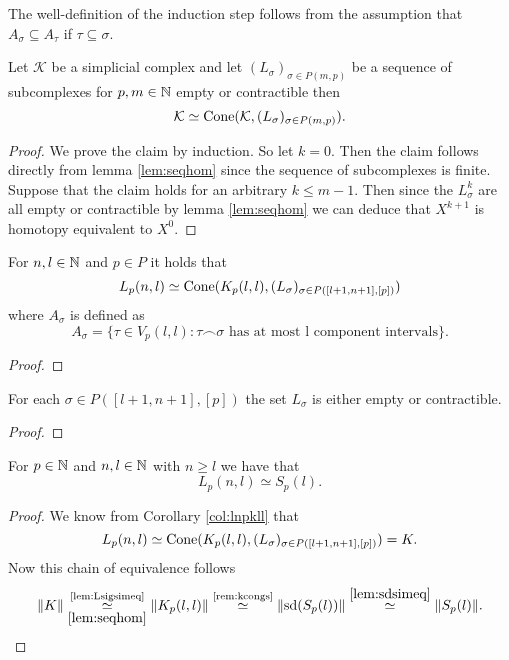 The well-definition of the induction step follows from the assumption that $A_\sigma \subseteq A_\tau$ if $\tau \subseteq \sigma$.

\begin{lemma}
  Let $\mathcal{K}$ be a simplicial complex and let $(L_\sigma)_{\sigma \in P(m,p)}$ be a sequence of subcomplexes for $p,m \in \mathbb{N}$ empty or contractible then \[\mathcal{K} \simeq {\rm Cone}(\mathcal{K}, (L_\sigma)_{\sigma \in P(m,p)}).\]  
\end{lemma}

\begin{proof}
  We prove the claim by induction. So let $k = 0$. Then the claim follows directly from lemma \ref{lem:seqhom} since the sequence of subcomplexes is finite.
  Suppose that the claim holds for an arbitrary $k \leq m - 1$. Then since the $L^k_\sigma$ are all empty or contractible by lemma \ref{lem:seqhom} we can deduce that $X^{k+1}$ is homotopy equivalent to $X^0$.
\end{proof}

\begin{col}\label{col:lnpkll}
  For $n,l \in \mathbb{N}$ and $p \in P$ it holds that \[L_p(n,l) \simeq {\rm Cone}(K_p(l,l), (L_\sigma)_{\sigma \in P([l+1,n+1],[p])})\]where $A_\sigma$ is defined as \[A_\sigma = \{\tau\in V_p(l,l)\colon \tau\frown\sigma \text{ has at most l component intervals}\}.\]
\end{col}

\begin{proof}
  
\end{proof}

\begin{lemma}\label{lem:Lsigsimeq}
  For each $\sigma \in P([l+1,n+1], [p])$ the set $L_\sigma$ is either empty or contractible.
\end{lemma}


\begin{proof}
  
\end{proof}

\begin{col}
  For $p \in \mathbb{N}$ and $n,l\in \mathbb{N}$ with $n \geq l$ we have that \[L_p(n,l) \simeq S_p(l).\]
\end{col}

\begin{proof}
  We know from Corollary \ref{col:lnpkll} that \[L_p(n,l) \simeq {\rm Cone}(K_p(l,l), (L_\sigma)_{\sigma\in P([l+1,n+1],[p])}) = K.\] Now this chain of equivalence follows
  \begin{equation*}
    \lVert K \rVert \underset{\ref{lem:seqhom}}{\overset{\text{\ref{lem:Lsigsimeq}}}{\simeq}} \lVert K_p(l,l) \rVert \overset{\text{\ref{rem:kcongs}}}{\simeq} \lVert {\rm sd}(S_p(l)) \rVert \overset{\ref{lem:sdsimeq}}{\simeq} \lVert S_p(l) \rVert.
  \end{equation*}
\end{proof}

